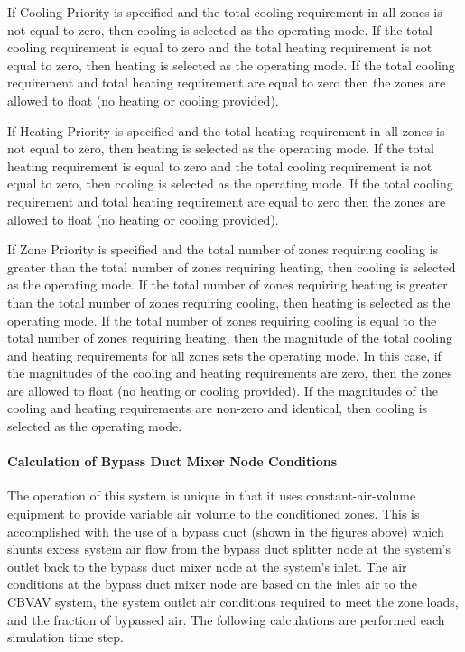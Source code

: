 If Cooling Priority is specified and the total cooling requirement in all zones is not equal to zero, then cooling is selected as the operating mode. If the total cooling requirement is equal to zero and the total heating requirement is not equal to zero, then heating is selected as the operating mode. If the total cooling requirement and total heating requirement are equal to zero then the zones are allowed to float (no heating or cooling provided).

If Heating Priority is specified and the total heating requirement in all zones is not equal to zero, then heating is selected as the operating mode. If the total heating requirement is equal to zero and the total cooling requirement is not equal to zero, then cooling is selected as the operating mode. If the total cooling requirement and total heating requirement are equal to zero then the zones are allowed to float (no heating or cooling provided).

If Zone Priority is specified and the total number of zones requiring cooling is greater than the total number of zones requiring heating, then cooling is selected as the operating mode. If the total number of zones requiring heating is greater than the total number of zones requiring cooling, then heating is selected as the operating mode. If the total number of zones requiring cooling is equal to the total number of zones requiring heating, then the magnitude of the total cooling and heating requirements for all zones sets the operating mode. In this case, if the magnitudes of the cooling and heating requirements are zero, then the zones are allowed to float (no heating or cooling provided). If the magnitudes of the cooling and heating requirements are non-zero and identical, then cooling is selected as the operating mode.

\paragraph{Calculation of Bypass Duct Mixer Node Conditions}\label{calculation-of-bypass-duct-mixer-node-conditions}

The operation of this system is unique in that it uses constant-air-volume equipment to provide variable air volume to the conditioned zones. This is accomplished with the use of a bypass duct (shown in the figures above) which shunts excess system air flow from the bypass duct splitter node at the system's outlet back to the bypass duct mixer node at the system's inlet. The air conditions at the bypass duct mixer node are based on the inlet air to the CBVAV system, the system outlet air conditions required to meet the zone loads, and the fraction of bypassed air. The following calculations are performed each simulation time step.

